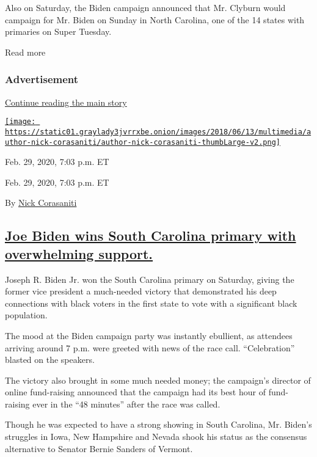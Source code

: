 Also on Saturday, the Biden campaign announced that Mr. Clyburn would
campaign for Mr. Biden on Sunday in North Carolina, one of the 14 states
with primaries on Super Tuesday.

Read more

\hypertarget{advertisement-2}{%
\subsubsection{Advertisement}\label{advertisement-2}}

\protect\hyperlink{after-dfp-ad-mid3}{Continue reading the main story}

\href{https://www.nytimes3xbfgragh.onion/by/nick-corasaniti}{\texttt{[image: https://static01.graylady3jvrrxbe.onion/images/2018/06/13/multimedia/author-nick-corasaniti/author-nick-corasaniti-thumbLarge-v2.png]}}

Feb. 29, 2020, 7:03 p.m. ET

Feb. 29, 2020, 7:03 p.m. ET

By \href{https://www.nytimes3xbfgragh.onion/by/nick-corasaniti}{Nick
Corasaniti}

\hypertarget{joe-biden-wins-south-carolina-primary-with-overwhelming-support}{%
\subsection{\texorpdfstring{\protect\hyperlink{joe-biden-wins-south-carolina-primary}{Joe
Biden wins South Carolina primary with overwhelming
support.}}{Joe Biden wins South Carolina primary with overwhelming support.}}\label{joe-biden-wins-south-carolina-primary-with-overwhelming-support}}

Joseph R. Biden Jr. won the South Carolina primary on Saturday, giving
the former vice president a much-needed victory that demonstrated his
deep connections with black voters in the first state to vote with a
significant black population.

The mood at the Biden campaign party was instantly ebullient, as
attendees arriving around 7 p.m. were greeted with news of the race
call. ``Celebration'' blasted on the speakers.

The victory also brought in some much needed money; the campaign's
director of online fund-raising announced that the campaign had its best
hour of fund-raising ever in the ``48 minutes'' after the race was
called.

Though he was expected to have a strong showing in South Carolina, Mr.
Biden's struggles in Iowa, New Hampshire and Nevada shook his status as
the consensus alternative to Senator Bernie Sanders of Vermont.

